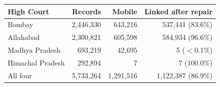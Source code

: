 \begin{tabular}{lrrr}
\toprule
High Court & Records & Mobile & Linked after repair \\
\midrule
Bombay & 2{,}446{,}330 & 643{,}216 & 537{,}441 (83.6\%) \\
Allahabad & 2{,}300{,}821 & 605{,}598 & 584{,}934 (96.6\%) \\
Madhya Pradesh & 693{,}219 & 42{,}695 & 5 ($<$0.1\%) \\
Himachal Pradesh & 292{,}894 & 7 & 7 (100.0\%) \\
\midrule
All four & 5{,}733{,}264 & 1{,}291{,}516 & 1{,}122{,}387 (86.9\%) \\
\bottomrule
\end{tabular}
